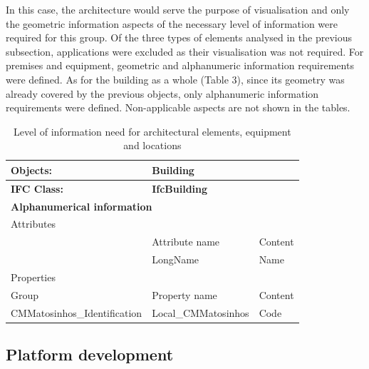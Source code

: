 \documentclass[a4paper, 10pt, twocolumn, twoside]{article}
\begin{document}
In this case, the architecture would serve the purpose of visualisation and only the geometric information aspects of the necessary level of information were required for this group. Of the three types of elements analysed in the previous subsection, applications were excluded as their visualisation was not required. For premises and equipment, geometric and alphanumeric information requirements were defined. As for the building as a whole (Table 3), since its geometry was already covered by the previous objects, only alphanumeric information requirements were defined. Non-applicable aspects are not shown in the tables.

\begin{table}[!htb]
    \renewcommand{\arraystretch}{2}
    \centering
    \caption{Level of information need for architectural elements, equipment and locations}
    \label{loin_equipment}
    \begin{tabular}{p{5.1cm}|p{4.3cm}|p{4.3cm}}
    \hline
    {\raggedright\textbf{Objects:}} & \multicolumn{2}{l}{\textbf{Building}}\\
    \hline
    {\raggedright\textbf{IFC Class:}} & \multicolumn{2}{l}{\textbf{IfcBuilding}}\\
    \hline
    \multicolumn{3}{l}{\textbf{Alphanumerical information}} \\
    \hline
    \multicolumn{3}{l}{Attributes} \\
    \hline
    & Attribute name & Content\\
    \hline
    & LongName & Name\\
    \hline
    \multicolumn{3}{l}{Properties} \\
    \hline
    Group & Property name & Content\\
    \hline
    CMMatosinhos\_Identification & Local\_CMMatosinhos & Code\\
    \hline
    \end{tabular}
\end{table}

\subsection{Platform development}
\label{subsec:platform}
\end{document}
